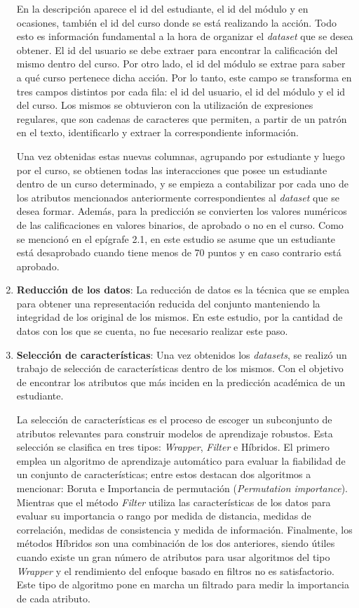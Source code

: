 \begin{enumerate}
    En la descripción aparece el id del estudiante, el id del módulo y en ocasiones, también el id del curso donde se está realizando la acción. Todo esto es información fundamental a la hora de organizar el \textit{dataset} que se desea obtener. El id del usuario se debe extraer para encontrar la calificación del mismo dentro del curso. Por otro lado, el id del módulo se extrae para saber a qué curso pertenece dicha acción. Por lo tanto, este campo se transforma en tres campos distintos por cada fila: el id del usuario, el id del módulo y el id del curso. Los mismos se obtuvieron con la utilización de expresiones regulares, que son cadenas de caracteres que permiten, a partir de un patrón en el texto, identificarlo y extraer la correspondiente información. 

    Una vez obtenidas estas nuevas columnas, agrupando por estudiante y luego por el curso, se obtienen todas las interacciones que posee un estudiante dentro de un curso determinado, y se empieza a contabilizar por cada uno de los atributos mencionados anteriormente correspondientes al \textit{dataset} que se desea formar. Además, para la predicción se convierten los valores numéricos de las calificaciones en valores binarios, de aprobado o no en el curso. Como se mencionó en el epígrafe 2.1, en este estudio se asume que un estudiante está desaprobado cuando tiene menos de 70 puntos y en caso contrario está aprobado.

    \item \textbf{Reducción de los datos}: La reducción de datos es la técnica que se emplea para obtener una representación reducida del conjunto manteniendo la integridad de los original de los mismos. En este estudio, por la cantidad de datos con los que se cuenta, no fue necesario realizar este paso.
    \item \textbf{Selección de características}: Una vez obtenidos los \textit{datasets}, se realizó un trabajo de selección de características dentro de los mismos. Con el objetivo de encontrar los atributos que más inciden en la predicción académica de un estudiante. 

    La selección de características es el proceso de escoger un subconjunto de atributos relevantes para construir modelos de aprendizaje robustos. Esta selección se clasifica en tres tipos: \textit{Wrapper}, \textit{Filter} e Híbridos. El primero emplea un algoritmo de aprendizaje automático para evaluar la fiabilidad de un conjunto de características; entre estos destacan dos algoritmos a mencionar: Boruta e Importancia de permutación (\textit{Permutation importance}). Mientras que el método \textit{Filter} utiliza las características de los datos para evaluar su importancia o rango por medida de distancia, medidas de correlación, medidas de consistencia y medida de información. Finalmente, los métodos Híbridos son una combinación de los dos anteriores, siendo útiles cuando existe un gran número de atributos para usar algoritmos del tipo \textit{Wrapper} y el rendimiento del enfoque basado en filtros no es satisfactorio. Este tipo de algoritmo pone en marcha un filtrado para medir la importancia de cada atributo.   
    

\end{enumerate}
